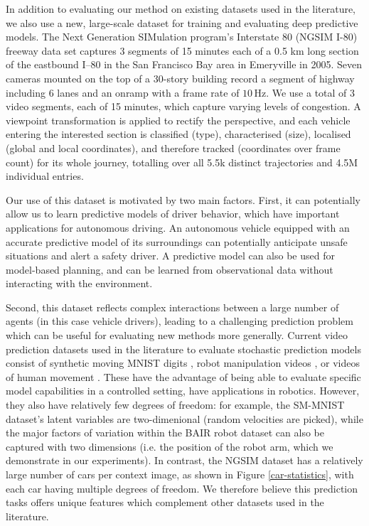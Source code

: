 \documentclass{article}
\begin{document}
In addition to evaluating our method on existing datasets used in the literature, we also use a new, large-scale dataset for training and evaluating deep predictive models.
The Next Generation SIMulation program's Interstate 80 (NGSIM I-80) freeway data set \cite{halkias2006ngsim} captures 3 segments of 15 minutes each of a 0.5 km long section of the eastbound I–80 in the San Francisco Bay area in Emeryville in 2005.
Seven cameras mounted on the top of a 30-story building record a segment of highway including 6 lanes and an onramp with a frame rate of $10\,\text{Hz}$.
We use a total of 3 video segments, each of 15 minutes, which capture varying levels of congestion.
A viewpoint transformation is applied to rectify the perspective, and each vehicle entering the interested section is classified (type), characterised (size), localised (global and local coordinates), and therefore tracked (coordinates over frame count) for its whole journey, totalling over all 5.5k distinct trajectories and 4.5M individual entries.

Our use of this dataset is motivated by two main factors.
First, it can potentially allow us to learn predictive models of driver behavior, which have important applications for autonomous driving.
An autonomous vehicle equipped with an accurate predictive model of its surroundings can potentially anticipate unsafe situations and alert a safety driver.
A predictive model can also be used for model-based planning, and can be learned from observational data without interacting with the environment.

Second, this dataset reflects complex interactions between a large number of agents (in this case vehicle drivers), leading to a challenging prediction problem which can be useful for evaluating new methods more generally. Current video prediction datasets used in the literature to evaluate stochastic prediction models consist of synthetic moving MNIST digits \citep{Denton2018}, robot manipulation videos \citep{Ebert17}, or videos of human movement \citep{Human}. These have the advantage of being able to evaluate specific model capabilities in a controlled setting, have applications in robotics. However, they also have relatively few degrees of freedom: for example, the SM-MNIST dataset's latent variables are two-dimenional (random velocities are picked), while the major factors of variation within the BAIR robot dataset can also be captured with two dimensions (i.e. the position of the robot arm, which we demonstrate in our experiments).
In contrast, the NGSIM dataset has a relatively large number of cars per context image, as shown in Figure \ref{car-statistics}, with each car having multiple degrees of freedom.
We therefore believe this prediction tasks offers unique features which complement other datasets used in the literature.
\end{document}
